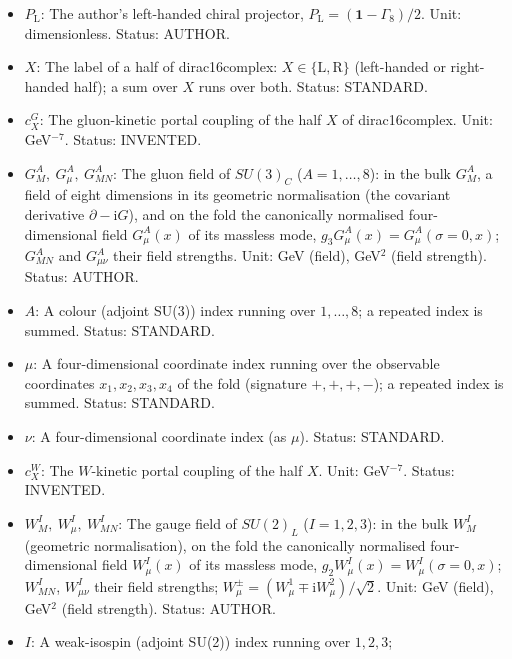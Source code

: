 \documentclass[
  10pt,
]{article}
\begin{document}
\begin{itemize}
  states, its adjoint with respect to the scalar product of that space
  (for the quantised dirac16complex the indefinite Krein scalar
  product). Status: STANDARD.
\item
  \(P_{\mathrm{L}}\): The author's left-handed chiral projector,
  \(P_{\mathrm{L}} = (\mathbf{1} - \Gamma_8)/2\). Unit: dimensionless.
  Status: AUTHOR.
\item
  \(X\): The label of a half of dirac16complex:
  \(X \in \{\mathrm{L}, \mathrm{R}\}\) (left-handed or right-handed
  half); a sum over \(X\) runs over both. Status: STANDARD.
\item
  \(c^{G}_X\): The gluon-kinetic portal coupling of the half \(X\) of
  dirac16complex. Unit: GeV\(^{-7}\). Status: INVENTED.
\item
  \(G^A_M,\ G^A_\mu,\ G^A_{MN}\): The gluon field of \(SU(3)_C\)
  (\(A = 1, \dots, 8\)): in the bulk \(G^A_M\), a field of eight
  dimensions in its geometric normalisation (the covariant derivative
  \(\partial - \mathrm{i}G\)), and on the fold the canonically
  normalised four-dimensional field \(G^A_\mu(x)\) of its massless mode,
  \(g_3G^A_\mu(x) = G^A_\mu(\sigma = 0, x)\); \(G^A_{MN}\) and
  \(G^A_{\mu\nu}\) their field strengths. Unit: GeV (field), GeV\(^2\)
  (field strength). Status: AUTHOR.
\item
  \(A\): A colour (adjoint SU(3)) index running over \(1, \dots, 8\); a
  repeated index is summed. Status: STANDARD.
\item
  \(\mu\): A four-dimensional coordinate index running over the
  observable coordinates \(x_1, x_2, x_3, x_4\) of the fold (signature
  \(+,+,+,-\)); a repeated index is summed. Status: STANDARD.
\item
  \(\nu\): A four-dimensional coordinate index (as \(\mu\)). Status:
  STANDARD.
\item
  \(c^{W}_X\): The \(W\)-kinetic portal coupling of the half \(X\).
  Unit: GeV\(^{-7}\). Status: INVENTED.
\item
  \(W^I_M,\ W^I_\mu,\ W^I_{MN}\): The gauge field of \(SU(2)_L\)
  (\(I = 1, 2, 3\)): in the bulk \(W^I_M\) (geometric normalisation), on
  the fold the canonically normalised four-dimensional field
  \(W^I_\mu(x)\) of its massless mode,
  \(g_2W^I_\mu(x) = W^I_\mu(\sigma = 0, x)\); \(W^I_{MN}\),
  \(W^I_{\mu\nu}\) their field strengths;
  \(W^\pm_\mu = (W^1_\mu \mp \mathrm{i}W^2_\mu)/\sqrt2\). Unit: GeV
  (field), GeV\(^2\) (field strength). Status: AUTHOR.
\item
  \(I\): A weak-isospin (adjoint SU(2)) index running over \(1, 2, 3\);

\end{itemize}
\end{document}
